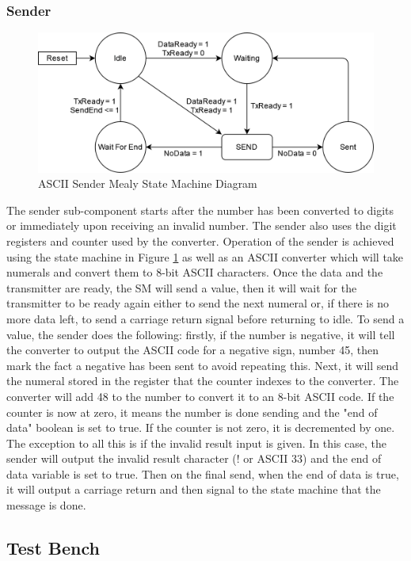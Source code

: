 \documentclass[11pt]{article}
\begin{document}
\subsubsection{Sender}
\begin{figure}[H]        
    \centering
    \includegraphics[width=.5\textwidth]{SenderSM.drawio.png}
    \caption{ASCII Sender Mealy State Machine Diagram}
    \label{fig:sendersm}
\end{figure} 

The sender sub-component starts after the number has been converted to digits or immediately upon receiving an invalid number. 
The sender also uses the digit registers and counter used by the converter.
Operation of the sender is achieved using the state machine in Figure \ref{fig:sendersm} as well as an ASCII converter which will take numerals and convert them to 8-bit ASCII characters.
Once the data and the transmitter are ready, the SM will send a value,
then it will wait for the transmitter to be ready again either to send the next numeral or, if there is no more data left, to send a carriage return signal before returning to idle.
To send a value, the sender does the following: firstly, if the number is negative, it will tell the converter to output the ASCII code for a negative sign, number 45, then mark the fact a negative has been sent to avoid repeating this.
Next, it will send the numeral stored in the register that the counter indexes to the converter.
The converter will add 48 to the number to convert it to an 8-bit ASCII code.
If the counter is now at zero, it means the number is done sending and the "end of data" boolean is set to true.
If the counter is not zero, it is decremented by one.
The exception to all this is if the invalid result input is given.
In this case, the sender will output the invalid result character (! or ASCII 33) and the end of data variable is set to true.
Then on the final send, when the end of data is true, it will output a carriage return and then signal to the state machine that the message is done.

\subsection{Test Bench}
\end{document}
